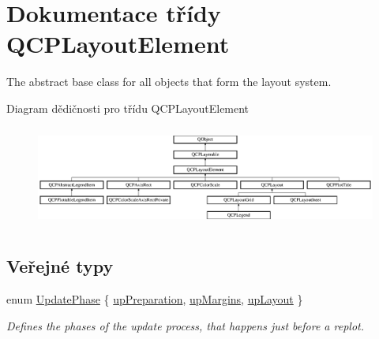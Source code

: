 \hypertarget{classQCPLayoutElement}{}\section{Dokumentace třídy Q\+C\+P\+Layout\+Element}
\label{classQCPLayoutElement}


The abstract base class for all objects that form the layout system.  


Diagram dědičnosti pro třídu Q\+C\+P\+Layout\+Element\begin{figure}[H]
\begin{center}
\leavevmode
\includegraphics[height=3.376884cm]{classQCPLayoutElement}
\end{center}
\end{figure}
\subsection*{Veřejné typy}
\begin{DoxyCompactItemize}
\item 
enum \hyperlink{classQCPLayoutElement_a0d83360e05735735aaf6d7983c56374d}{Update\+Phase} \{ \hyperlink{classQCPLayoutElement_a0d83360e05735735aaf6d7983c56374dad6119882eba136357c2f627992e527d3}{up\+Preparation}, 
\hyperlink{classQCPLayoutElement_a0d83360e05735735aaf6d7983c56374da288cb59a92280e47261a341f2813e676}{up\+Margins}, 
\hyperlink{classQCPLayoutElement_a0d83360e05735735aaf6d7983c56374da5d1ccf5d79967c232c3c511796860045}{up\+Layout}
 \}\begin{DoxyCompactList}\small\item\em Defines the phases of the update process, that happens just before a replot. \end{DoxyCompactList}
\end{DoxyCompactItemize}
